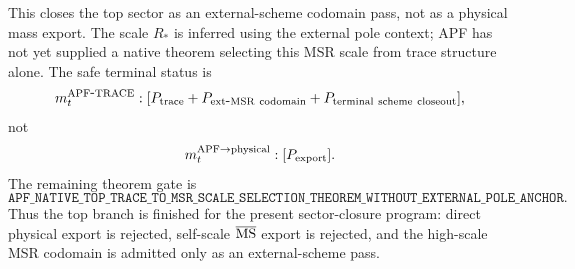 This closes the top sector as an external-scheme codomain pass, not as a physical mass export. The scale
\(R_*\) is inferred using the external pole context; APF has not yet supplied a native theorem selecting this
MSR scale from trace structure alone. The safe terminal status is
\begin{equation}
  m_t^{\rm APF\mbox{-}TRACE}:
  [P_{\rm trace}+P_{\rm ext\mbox{-}MSR\ codomain}+P_{\rm terminal\ scheme\ closeout}],
\end{equation}
not
\begin{equation}
  m_t^{\rm APF\to physical}:[P_{\rm export}].
\end{equation}
The remaining theorem gate is
\begin{equation}
  \texttt{APF\_NATIVE\_TOP\_TRACE\_TO\_MSR\_SCALE\_SELECTION\_THEOREM\_WITHOUT\_EXTERNAL\_POLE\_ANCHOR}.
\end{equation}
Thus the top branch is finished for the present sector-closure program: direct physical export is rejected,
self-scale \(\overline{\rm MS}\) export is rejected, and the high-scale MSR codomain is admitted only as an
external-scheme pass.
